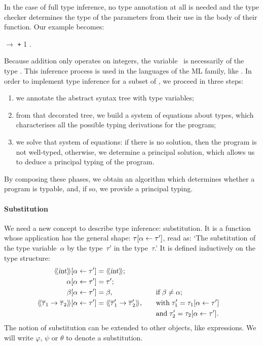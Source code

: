 In the case of full type inference, no type annotation at all is
needed and the type checker determines the type of the parameters from
their use in the body of their function. Our example becomes:
\begin{center}
\Xfun {} $\rightarrow$ \Xlet {} \equal
{} \texttt{+} \num{1} \Xin {}.
\end{center}
Because addition only operates on integers, the variable~ is
necessarily of the type . This inference process is used in
the languages of the ML family, like \OCaml. In order to implement
type inference for a subset of \OCaml, we proceed in three steps:
\begin{enumerate}

  \item we annotate the abstract syntax tree with type variables;

  \item from that decorated tree, we build a system of equations about
    types, which characterises all the possible typing derivations for
    the program;

  \item we solve that system of equations: if there is no solution,
    then the program is not well\hyp{}typed, otherwise, we determine a
    principal solution, which allows us to deduce a principal typing
    of the program.

\end{enumerate}
By composing these phases, we obtain an algorithm which determines
whether a program is typable, and, if so, we provide a principal
typing.

\paragraph{Substitution}

We need a new concept to describe type inference: substitution. It is
a function whose application has the general shape:
${\tau}[\alpha \leftarrow \tau']$, read as: `The substitution of the type
variable~\(\alpha\) by the type~\(\tau'\) in the type~\(\tau\).' It is
defined inductively on the type structure:
\begin{alignat*}{2}
\subst{\src{\type{int}}}{\alpha}{\tau'} &= \src{\type{int}};\\
\subst{\alpha}{\alpha}{\tau'} &= \tau';\\
\subst{\beta}{\alpha}{\tau'} &= \beta,  && \quad \text{if} \; \beta \neq
  \alpha;\\
\subst{\src{\meta{\tau}_1 \rightarrow \meta{\tau}_2}}{\alpha}{\tau'}
&= \src{\meta{\tau}'_1 \rightarrow \meta{\tau}'_2},
&& \quad \text{with} \; \tau'_1 = \subst{\tau_1}{\alpha}{\tau'}\\
&&& \quad \text{and} \; \tau'_2 = \subst{\tau_2}{\alpha}{\tau'}.
\end{alignat*}
The notion of substitution can be extended to other objects, like
expressions. We will write $\varphi$, $\psi$ or $\theta$ to denote a
substitution.

